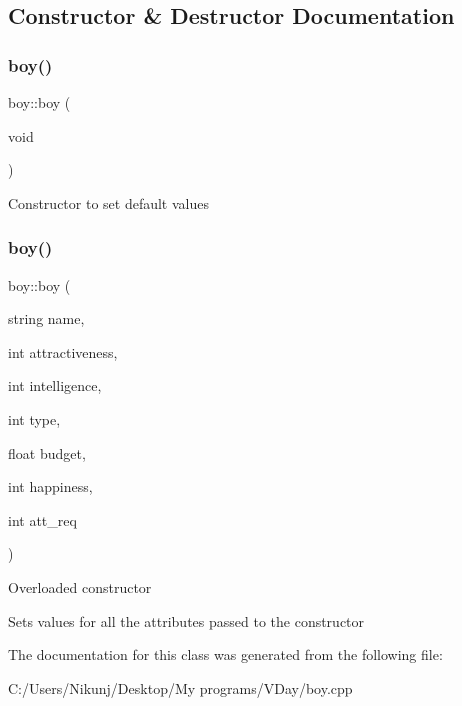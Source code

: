 \subsection{Constructor \& Destructor Documentation}
\mbox{\label{classboy_a6db802fcf1b08200d6c69552409a836d}} 
\subsubsection{\texorpdfstring{boy()}{boy()}\hspace{0.1cm}{\footnotesize\ttfamily [1/2]}}
{\footnotesize\ttfamily boy\+::boy (\begin{DoxyParamCaption}\item[{void}]{ }\end{DoxyParamCaption})\hspace{0.3cm}{\ttfamily [inline]}}

Constructor to set default values \mbox{\label{classboy_a56b23dfb0d5e95ff41896e83a2a443ac}} 
\subsubsection{\texorpdfstring{boy()}{boy()}\hspace{0.1cm}{\footnotesize\ttfamily [2/2]}}
{\footnotesize\ttfamily boy\+::boy (\begin{DoxyParamCaption}\item[{string}]{name,  }\item[{int}]{attractiveness,  }\item[{int}]{intelligence,  }\item[{int}]{type,  }\item[{float}]{budget,  }\item[{int}]{happiness,  }\item[{int}]{att\+\_\+req }\end{DoxyParamCaption})\hspace{0.3cm}{\ttfamily [inline]}}

Overloaded constructor

Sets values for all the attributes passed to the constructor 

The documentation for this class was generated from the following file\+:\begin{DoxyCompactItemize}
\item 
C\+:/\+Users/\+Nikunj/\+Desktop/\+My programs/\+V\+Day/boy.\+cpp\end{DoxyCompactItemize}
